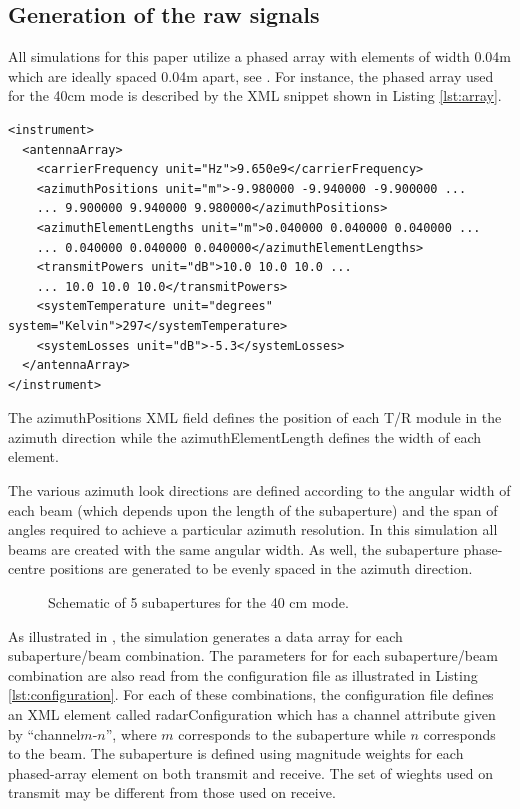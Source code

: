 \subsection{Generation of the raw signals}
All simulations for this paper utilize a phased array with elements of width 0.04m which are ideally spaced 0.04m apart, see . For instance, the phased array used for the 40cm mode is described by the XML snippet shown in Listing \ref{lst:array}.
\lstset{language=XML}
\begin{lstlisting}[caption={Phased Array configuration}, label={lst:array}]
<instrument>
  <antennaArray>
    <carrierFrequency unit="Hz">9.650e9</carrierFrequency>
    <azimuthPositions unit="m">-9.980000 -9.940000 -9.900000 ...
    ... 9.900000 9.940000 9.980000</azimuthPositions>
    <azimuthElementLengths unit="m">0.040000 0.040000 0.040000 ...
    ... 0.040000 0.040000 0.040000</azimuthElementLengths>
    <transmitPowers unit="dB">10.0 10.0 10.0 ...
    ... 10.0 10.0 10.0</transmitPowers>
    <systemTemperature unit="degrees" system="Kelvin">297</systemTemperature>
    <systemLosses unit="dB">-5.3</systemLosses>
  </antennaArray>
</instrument>
\end{lstlisting}
The azimuthPositions XML field defines the position of each T/R module in the azimuth direction while the azimuthElementLength defines the width of each element.
\par
The various azimuth look directions are defined according to the angular width of each beam (which depends upon the length of the subaperture) and the span of angles required to achieve a particular azimuth resolution. In this simulation all beams are created with the same angular width. As well, the subaperture phase-centre positions are generated to be evenly spaced in the azimuth direction.
\begin{figure}[h!]
\begin{center}
 \resizebox{0.8\columnwidth}{!}{}
 \caption{Schematic of 5 subapertures for the 40 cm mode.}
 \label{fg:fivechansubaperture}
 \end{center}
\end{figure}
\par
As illustrated in , the simulation generates a data array for each subaperture/beam combination. The parameters for for each subaperture/beam combination are also read from the configuration file as illustrated in Listing \ref{lst:configuration}. For each of these combinations, the configuration file defines an XML element called radarConfiguration which has a channel attribute given by ``channel$m$-$n$'', where $m$ corresponds to the subaperture while $n$ corresponds to the beam. The subaperture is defined using magnitude weights for each phased-array element on both transmit and receive. The set of wieghts used on transmit may be different from those used on receive. 
